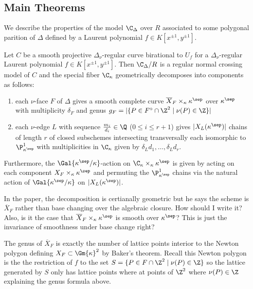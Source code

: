 \subsection{Main Theorems}

We describe the properties of the model $\C_\Delta$ over $R$ associated to some polygonal parition of $\Delta$ defined by a Laurent polynomial $f \in K[x^{\pm 1}, y^{\pm 1}]$. 

\begin{theorem}[DK, Thm. 3.13]
Let $C$ be a smooth projective $\Delta_\nu$-regular curve birational to $U_f$ for a $\Delta_\nu$-regular Laurent polynomial $f \in K[x^{\pm 1}, y^{\pm 1}]$. Then $\C_\Delta / R$ is a regular normal crossing model of $C$ and the special fiber $\C_\kappa$ geometrically decomposes into components as follows:
\begin{enumerate}
\item each $\nu$-face $F$ of $\Delta$ gives a smooth complete curve $\overline{X}_F \times_\kappa \kappa^{\sep}$ over $\kappa^\sep$ with multiplicity $\delta_F$ and genus $g_F = |\{ P \in F^\circ \cap \Z^2 \mid \nu(P) \in \Z \} |$
\item each $\nu$-edge $L$ with sequence $\frac{m_i}{d_i} \in \Q$ ($0 \le i \le r + 1$) gives $|X_L(\kappa^\sep)|$ chains of length $r$ of closed subschemes intersecting transversally each isomorphic to $\P^1_{\kappa^{\sep}}$ with multiplicities in $\C_\kappa$ given by $\delta_L d_1, \dots, \delta_L d_r$.
\end{enumerate}
Furthermore, the $\Gal{\kappa^\sep / \kappa}$-action on $\C_{\kappa} \times_\kappa \kappa^{\sep}$ is given by acting on each component $X_F \times_\kappa \kappa^\sep$ and permuting the $\P^1_{\kappa^\sep}$ chains via the natural action of $\Gal{\kappa^\sep / \kappa}$ on $|X_L(\kappa^\sep)|$. 
\end{theorem}

\begin{question}
In the paper, the decomposition is certianally geometric but he says the scheme is $\overline{X}_F$ rather than base changing over the algebraic closure. How should I write it? Also, is it the case that $\overline{X}_F \times_\kappa \kappa^\sep$ is smooth over $\kappa^\sep$? This is just the invariance of smoothness under base change right?
\end{question}

\begin{rmk}
The genus of $\overline{X}_F$ is exactly the number of lattice points interior to the Newton polygon defining $X_F \subset \Gm{\kappa}^2$ by Baker's theorem. Recall this Newton polygon is the the restriction of $f$ to the set $S = \{ P \in F \cap \Z^2 \mid \nu(P) \in \Z \}$ so the lattice generated by $S$ only has lattice points where at points of $\Z^2$ where $\nu(P) \in \Z$ explaining the genus formula above. 
\end{rmk}


